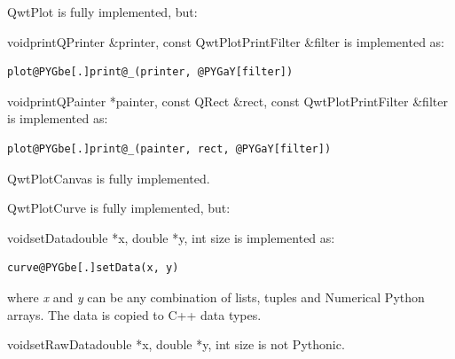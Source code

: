 \documentclass[a4paper,10pt,english]{manual}
\begin{document}
\hypertarget{PyQt4.Qwt5.QwtPlot}{}\begin{classdesc}{QwtPlot}{}
is fully implemented, but:

\hypertarget{print}{}\begin{cfuncdesc}{void}{print}{QPrinter \&printer, const QwtPlotPrintFilter \&filter}
is implemented as:

\begin{Verbatim}[commandchars=@\[\]]
plot@PYGbe[.]print@_(printer, @PYGaY[filter])
\end{Verbatim}
\end{cfuncdesc}

\begin{cfuncdesc}{void}{print}{QPainter *painter, const QRect \&rect, const QwtPlotPrintFilter \&filter}
is implemented as:

\begin{Verbatim}[commandchars=@\[\]]
plot@PYGbe[.]print@_(painter, rect, @PYGaY[filter])
\end{Verbatim}
\end{cfuncdesc}
\end{classdesc}

\hypertarget{PyQt4.Qwt5.QwtPlotCanvas}{}\begin{classdesc}{QwtPlotCanvas}{}
is fully implemented.
\end{classdesc}

\hypertarget{PyQt4.Qwt5.QwtPlotCurve}{}\begin{classdesc}{QwtPlotCurve}{}
is fully implemented, but:

\hypertarget{setData}{}\begin{cfuncdesc}{void}{setData}{double *x, double *y, int size}
is implemented as:

\begin{Verbatim}[commandchars=@\[\]]
curve@PYGbe[.]setData(x, y)
\end{Verbatim}

where \emph{x} and \emph{y} can be any combination of lists, tuples and
Numerical Python arrays.  The data is copied to C++ data types.
\end{cfuncdesc}

\hypertarget{setRawData}{}\begin{cfuncdesc}{void}{setRawData}{double *x, double *y, int size}
is not Pythonic.
\end{cfuncdesc}
\end{classdesc}
\end{document}
